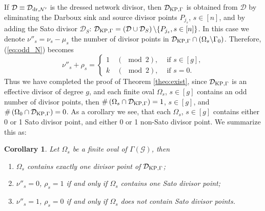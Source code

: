 \documentclass[11pt]{amsart}
\theoremstyle{plain}
\numberwithin{equation}{section}
\newtheorem{corollary}[theorem]{Corollary}
\def \DKP {{\mathcal D}_{\textup{\scriptsize KP},\Gamma}}
\begin{document}
If ${\mathcal D}\equiv {\mathcal D}_{\textup{\scriptsize dr}, {\mathcal N}^{\prime}}$ is the dressed network divisor, then  $\DKP$ is obtained from 
${\mathcal D}$ by eliminating the Darboux sink and source divisor points $P_{j_s}$, $s\in[n]$, and by adding the Sato divisor ${\mathcal D}_S$:
$\DKP=\left({\mathcal D}\cup {\mathcal D}_S\right) \backslash \{P_{j_s},s\in[n]\}$. In this case we denote $\nu''_s=\nu_s- \mu_{s}$ the number 
of divisor points in $\DKP\cap\left(\Omega_s\backslash \Gamma_0 \right)$. Therefore, (\ref{eq:odd_N}) becomes
\begin{equation}\label{eq:odd_N_3}
\nu''_{s}+ \rho_{s} = \left\{ \begin{array}{ll} 1 \quad
(\!\!\!\!\!\!\mod 2), & \mbox{ if } s\in [g],\\
k \quad
(\!\!\!\!\!\!\mod 2), & \mbox{ if } s=0.
\end{array}
\right.
\end{equation}
Thus we have completed the proof of Theorem \ref{theo:exist},
since $\DKP$ is an effective divisor of degree $g$, and each finite oval $\Omega_s$, $s\in[g]$ contains an odd number of divisor points, then $\# \left( \Omega_s \cap \DKP\right) =1$, $s\in [g]$, and $\# \left( \Omega_0 \cap \DKP\right) =0$. As a corollary 
we see, that each $\Omega_s$,   $s\in[g]$ contains either 0 or 1 Sato divisor point, and either 0 or 1 non-Sato  divisor point. We summarize 
this as:
\begin{corollary}
\label{cor:DKP}
Let $\Omega_s$ be a finite oval of $\Gamma(\mathcal G)$, then 
\begin{enumerate}
\item $\Omega_s$ contains exactly one divisor point of $\DKP$;
\item $\nu''_{s} = 0$, $\rho_s=1$ if and only if $\Omega_s$ contains one Sato divisor point;
\item $\nu''_{s} = 1$, $\rho_s=0$ if and only if $\Omega_s$ does not contain Sato divisor points.
\end{enumerate}
\end{corollary}
\end{document}
